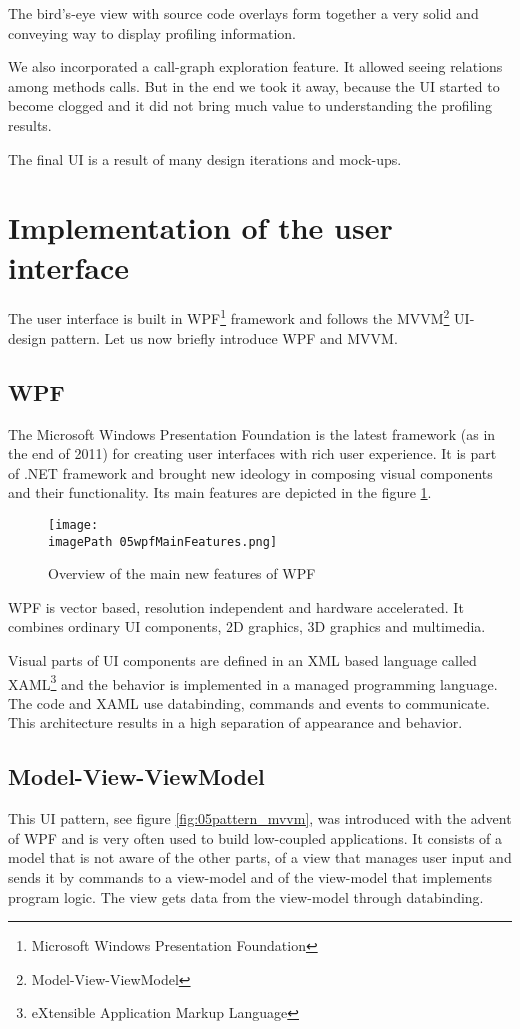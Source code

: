 The bird's-eye view with source code overlays form together a very solid and conveying way to display profiling information. 

We also incorporated a call-graph exploration feature. It allowed seeing relations among methods calls. But in the end we took it away, because the UI started to become clogged and it did not bring much value to understanding the profiling results. 

The final UI is a result of many design iterations and mock-ups.

\section{Implementation of the user interface}
The user interface is built in WPF\footnote{Microsoft Windows Presentation Foundation} framework \cite{WPF4Unleashed} and follows the MVVM\footnote{Model-View-ViewModel} \cite{MVVM2011} UI-design pattern. Let us now briefly introduce WPF and MVVM.

\subsection{WPF}
The Microsoft Windows Presentation Foundation is the latest framework (as in the end of 2011) for creating user interfaces with rich user experience. It is part of .NET framework and brought new ideology in composing visual components and their functionality. Its main features are depicted in the figure \ref{fig:05wpfMainFeatures}.

\begin{figure}
	\centering
		\texttt{[image: \\imagePath 05wpfMainFeatures.png]}
		\caption{Overview of the main new features of WPF \cite{WPFpage}}
	\label{fig:05wpfMainFeatures}
\end{figure}

WPF is vector based, resolution independent and hardware accelerated. It combines ordinary UI components, 2D graphics, 3D graphics and multimedia. 

Visual parts of UI components are defined in an XML based language called \linebreak XAML\footnote{eXtensible Application Markup Language} and the behavior is implemented in a managed programming language. The code and XAML use databinding, commands and events to communicate. This architecture results in a high separation of appearance and behavior.

\subsection{Model-View-ViewModel}
This UI pattern, see figure \ref{fig:05pattern_mvvm}, was introduced with the advent of WPF and is very often used to build low-coupled applications. It consists of a model that is not aware of the other parts, of a view that manages user input and sends it by commands to a view-model and of the view-model that implements program logic. The view gets data from the view-model through databinding.

